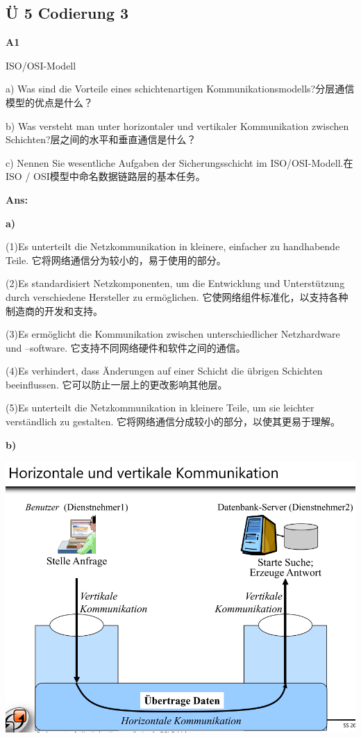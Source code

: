 \documentclass[fleqn]{article}
\begin{document}
\subsection{Ü 5 Codierung 3}

\noindent\textbf{A1}

ISO/OSI-Modell

a) Was sind die Vorteile eines schichtenartigen Kommunikationsmodells?分层通信模型的优点是什么？

b) Was versteht man unter horizontaler und vertikaler Kommunikation zwischen Schichten?层之间的水平和垂直通信是什么？

c) Nennen Sie wesentliche Aufgaben der Sicherungsschicht im ISO/OSI-Modell.在ISO / OSI模型中命名数据链路层的基本任务。

\textbf{Ans:}

\textbf{a)}

\indent\indent (1)Es unterteilt die Netzkommunikation in kleinere, einfacher zu handhabende Teile.
它将网络通信分为较小的，易于使用的部分。

\indent\indent (2)Es standardisiert Netzkomponenten, um die Entwicklung und Unterstützung durch verschiedene Hersteller zu ermöglichen.
它使网络组件标准化，以支持各种制造商的开发和支持。

\indent\indent (3)Es ermöglicht die Kommunikation zwischen unterschiedlicher Netzhardware und –software.
它支持不同网络硬件和软件之间的通信。

\indent\indent (4)Es verhindert, dass Änderungen auf einer Schicht die übrigen Schichten beeinflussen.
它可以防止一层上的更改影响其他层。

\indent\indent (5)Es unterteilt die Netzkommunikation in kleinere Teile, um sie leichter verständlich zu gestalten.
它将网络通信分成较小的部分，以使其更易于理解。

\textbf{b)}

\begin{center}
    \includegraphics[scale=0.4]{bild15.png}
\end{center}
\end{document}
